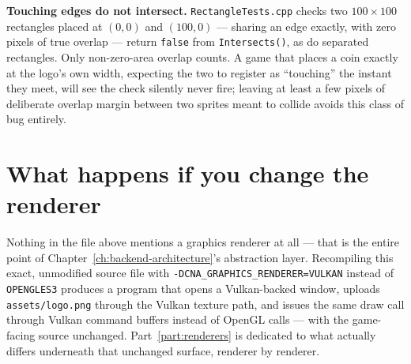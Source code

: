 \begin{sourcenote}
\textbf{Touching edges do not intersect.} \texttt{RectangleTests.cpp} checks two
$100\times100$ rectangles
placed at $(0,0)$ and $(100,0)$ --- sharing an edge exactly, with zero pixels of true overlap
--- return \texttt{false} from \texttt{Intersects()}, as do separated rectangles. Only
non-zero-area overlap counts. A game that places a
coin exactly at the logo's own width, expecting the two to register as ``touching'' the
instant they meet, will see the check silently never fire; leaving at least a few pixels of
deliberate overlap margin between two sprites meant to collide avoids this class of bug
entirely.
\end{sourcenote}

\section{What happens if you change the renderer}

Nothing in the file above mentions a graphics renderer at all --- that is the entire point of
Chapter~\ref{ch:backend-architecture}'s abstraction layer. Recompiling this exact,
unmodified source file with \texttt{-DCNA\_GRAPHICS\allowbreak{}\_RENDERER=VULKAN} instead of
\texttt{OPENGLES3} produces a program that opens a Vulkan-backed window, uploads
\texttt{assets/logo.png} through the Vulkan texture path, and issues the same
 draw call through Vulkan command buffers instead of OpenGL calls ---
with the game-facing source unchanged. Part~\ref{part:renderers} is dedicated to what actually
differs underneath that unchanged surface, renderer by renderer.
